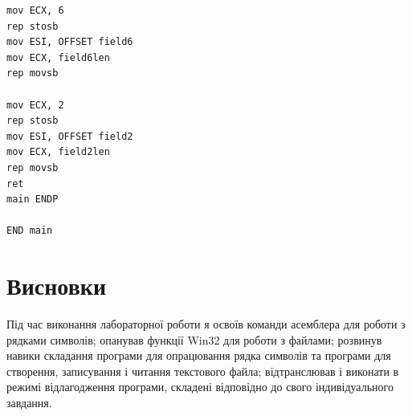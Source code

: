 \documentclass{article}
\begin{document}
\begin{normalsize}
\begin{lstlisting}[language={[x86masm]Assembler}]
mov ECX, 6
rep stosb
mov ESI, OFFSET field6
mov ECX, field6len
rep movsb

mov ECX, 2
rep stosb
mov ESI, OFFSET field2
mov ECX, field2len
rep movsb
ret
main ENDP

END main
	\end{lstlisting}


	\section*{Висновки}
	Під час виконання лабораторної роботи я освоїв команди асемблера для роботи з рядками символів; опанував функції Win32 для роботи з файлами; розвинув навики складання програми для опрацювання рядка символів та програми для створення, записування і читання текстового файла; відтранслював і виконати в режимі відлагодження програми, складені відповідно до свого індивідуального завдання.
	    
\end{normalsize}
\end{document}
